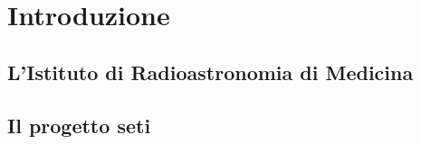 \chapter*{Introduzione}
\label{intro}

\section{L'Istituto di Radioastronomia di Medicina}
\section{Il progetto \ac{seti}}
